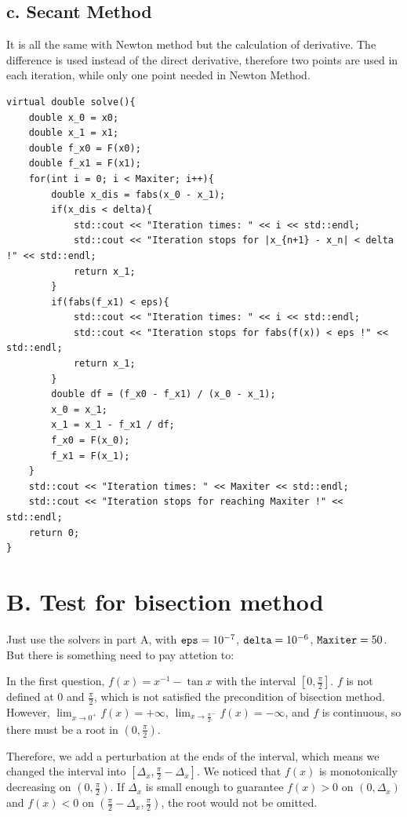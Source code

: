 \documentclass[a4paper]{article}
\begin{document}
\subsection*{c. Secant Method}
It is all the same with Newton method but the calculation of derivative. The difference is used instead of the direct derivative, therefore two points are used in 
each iteration, while only one point needed in Newton Method.
\begin{lstlisting}
virtual double solve(){
    double x_0 = x0;
    double x_1 = x1;
    double f_x0 = F(x0);
    double f_x1 = F(x1);
    for(int i = 0; i < Maxiter; i++){
        double x_dis = fabs(x_0 - x_1);
        if(x_dis < delta){
            std::cout << "Iteration times: " << i << std::endl;
            std::cout << "Iteration stops for |x_{n+1} - x_n| < delta !" << std::endl;
            return x_1;
        }
        if(fabs(f_x1) < eps){
            std::cout << "Iteration times: " << i << std::endl;
            std::cout << "Iteration stops for fabs(f(x)) < eps !" << std::endl;
            return x_1;
        }
        double df = (f_x0 - f_x1) / (x_0 - x_1);
        x_0 = x_1;
        x_1 = x_1 - f_x1 / df;
        f_x0 = F(x_0);
        f_x1 = F(x_1);
    }
    std::cout << "Iteration times: " << Maxiter << std::endl;
    std::cout << "Iteration stops for reaching Maxiter !" << std::endl;
    return 0;
}
\end{lstlisting}

\section*{B. Test for bisection method}
Just use the solvers in part A, with $\verb|eps| = 10^{-7}$, $\verb|delta| = 10^{-6}$, $\verb|Maxiter| = 50$. But there is something need to pay attetion to:

In the first question, $f(x) = x^{-1} - \tan x$ with the interval $[0,\frac{\pi}{2}]$. $f$ is not defined at $0$ and $\frac{\pi}{2}$, which is not satisfied the 
precondition of bisection method. However, $\lim_{x\rightarrow 0^+}f(x) = +\infty$, $\lim_{x\rightarrow \frac{\pi}{2}^-}f(x) = -\infty$, and $f$ is continuous, so there must be 
a root in $(0,\frac{\pi}{2})$.

Therefore, we add a perturbation at the ends of the interval, which means we changed the interval into $[\Delta_x, \frac{\pi}{2} - \Delta_x]$. We noticed that $f(x)$ 
is monotonically decreasing on $(0,\frac{\pi}{2})$. If $\Delta_x$ is small 
enough to guarantee $f(x) > 0$ on $(0,\Delta_x)$ and $f(x) < 0$ on $(\frac{\pi}{2} - \Delta_x, \frac{\pi}{2})$, the root would not be omitted.
\end{document}

